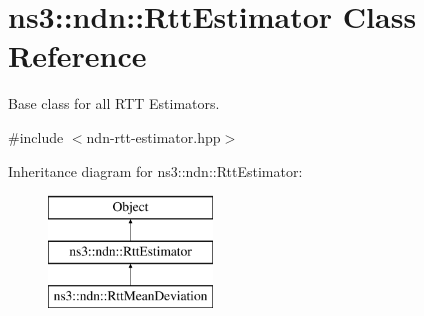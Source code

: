 \hypertarget{classns3_1_1ndn_1_1RttEstimator}{}\section{ns3\+:\+:ndn\+:\+:Rtt\+Estimator Class Reference}
\label{classns3_1_1ndn_1_1RttEstimator}


Base class for all R\+TT Estimators.  




{\ttfamily \#include $<$ndn-\/rtt-\/estimator.\+hpp$>$}

Inheritance diagram for ns3\+:\+:ndn\+:\+:Rtt\+Estimator\+:\begin{figure}[H]
\begin{center}
\leavevmode
\includegraphics[height=3.000000cm]{classns3_1_1ndn_1_1RttEstimator}
\end{center}
\end{figure}
